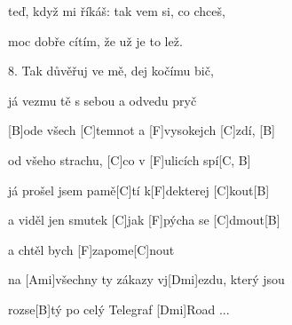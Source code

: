 teď, když mi říkáš: tak vem si, co chceš,

moc dobře cítím, že už je to lež.



8. Tak důvěřuj ve mě, dej kočímu bič,

já vezmu tě s sebou a odvedu pryč

[B]ode všech [C]temnot a [F]vysokejch [C]zdí, [B]

od všeho strachu, [C]co v [F]ulicích spí[C, B]

já prošel jsem pamě[C]tí k[F]dekterej [C]kout[B]

a viděl jen smutek [C]jak [F]pýcha se [C]dmout[B]

a chtěl bych [F]zapome[C]nout

na [Ami]všechny ty zákazy vj[Dmi]ezdu, který jsou

rozse[B]tý po celý Telegraf [Dmi]Road ...
